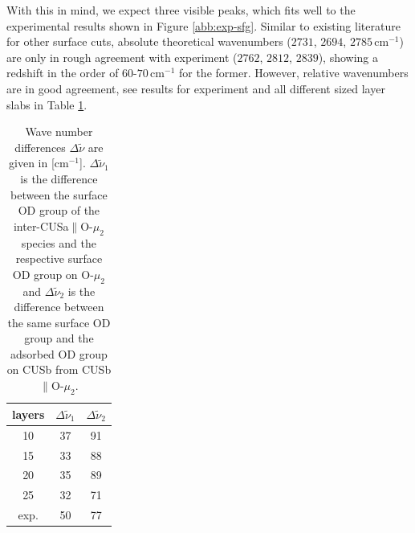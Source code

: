 \documentclass[11pt,DIV=13,BCOR=5mm,a4paper,headinclude]{scrbook}
\begin{document}
With this in mind, we expect three visible peaks, which fits well to the experimental results shown in Figure \ref{abb:exp-sfg}.
Similar to existing literature for other surface cuts\cite{Wirth2014}, absolute theoretical wavenumbers ($2731$, $2694$, $2785\,$cm$^{-1}$) are only in rough agreement with experiment ($2762$, $2812$, $2839$), showing a redshift in the order of $60$-$70\,$cm$^{-1}$ for the former.
However, relative wavenumbers are in good agreement, see results for experiment and all different sized layer slabs in Table \ref{tab:rel_modes}.
\begin{table}[!h]
\begin{center}
\caption{Wave number differences $\Delta \tilde{\nu}$ are given in [cm$^{-1}$].
$\Delta \tilde{\nu}_1$ is the difference between the surface OD group of the inter-CUSa$\parallel$O-$\mu_2$ species and the respective surface OD group on O-$\mu_2$ and  $\Delta \tilde{\nu}_2$ is the difference between the same surface OD group and the adsorbed OD group on CUSb from CUSb$\parallel$O-$\mu_2$.}
\begin{tabular}{ccc}
\toprule
layers & $\Delta \tilde{\nu}_1$ &  $\Delta \tilde{\nu}_2$\\\midrule
10  &37 &91 \\
15  &33 &88 \\
20  &35 &89 \\
25  &32 &71 \\\midrule
exp.&50 &77 \\\bottomrule
  \end{tabular}
\label{tab:rel_modes}
\end{center}
\end{table}
\\
\\

\end{document}

